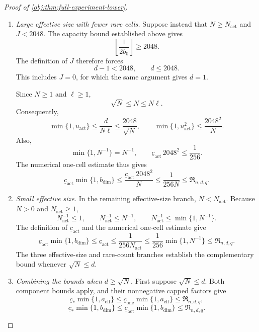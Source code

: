 \begin{proof}[Proof of \cref{obj:thm:full-experiment-lower}]
\begin{enumerate}
\item \emph{Large effective size with fewer rare cells.}
Suppose instead that \(N\ge N_{\mathrm{act}}\) and \(J<2048\).
The capacity bound established above gives
\[
\left\lfloor\frac1{2b_0}\right\rfloor\ge2048.
\]
The definition of \(J\) therefore forces
\[
d-1<2048,\qquad d\le2048.
\]
This includes \(J=0\), for which the same argument gives \(d=1\).

Since \(N\ge1\) and \(\ell\ge1\),
\[
\sqrt N\le N\le N\ell.
\]
Consequently,
\[
\min\{1,u_{\mathrm{act}}\}
\le\frac{d}{N\ell}
\le\frac{2048}{\sqrt N},
\qquad
\min\{1,u_{\mathrm{act}}^2\}
\le\frac{2048^2}{N}.
\]
Also,
\[
\min\{1,N^{-1}\}=N^{-1},
\qquad
\underline c_{\mathrm{act}}\,2048^2\le\frac1{256}.
\]
The numerical one-cell estimate thus gives
\[
\underline c_{\mathrm{act}}\min\{1,b_{\mathrm{dim}}\}
\le
\frac{\underline c_{\mathrm{act}}\,2048^2}{N}
\le\frac1{256N}
\le\mathfrak R_{n,d,q}.
\]

\item \emph{Small effective size.}
In the remaining effective-size branch, \(N<N_{\mathrm{act}}\).
Because \(N>0\) and \(N_{\mathrm{act}}\ge1\),
\[
N_{\mathrm{act}}^{-1}\le1,\qquad
N_{\mathrm{act}}^{-1}\le N^{-1},
\qquad
N_{\mathrm{act}}^{-1}\le\min\{1,N^{-1}\}.
\]
The definition of \(\underline c_{\mathrm{act}}\) and the numerical
one-cell estimate give
\[
\underline c_{\mathrm{act}}\min\{1,b_{\mathrm{dim}}\}
\le\underline c_{\mathrm{act}}
\le\frac1{256N_{\mathrm{act}}}
\le\frac1{256}\min\{1,N^{-1}\}
\le\mathfrak R_{n,d,q}.
\]
The three effective-size and rare-count branches establish the complementary
bound whenever \(\sqrt N\le d\).

\item \emph{Combining the bounds when \(d\ge\sqrt N\).}
First suppose \(\sqrt N\le d\). Both component bounds apply, and their
nonnegative capped factors give
\[
\underline c_*\min\{1,a_{\mathrm{eff}}\}
\le
\underline c_{\mathrm{one}}\min\{1,a_{\mathrm{eff}}\}
\le\mathfrak R_{n,d,q},
\]
\[
\underline c_*\min\{1,b_{\mathrm{dim}}\}
\le
\underline c_{\mathrm{act}}\min\{1,b_{\mathrm{dim}}\}
\le\mathfrak R_{n,d,q}.
\]


\end{enumerate}
\end{proof}
